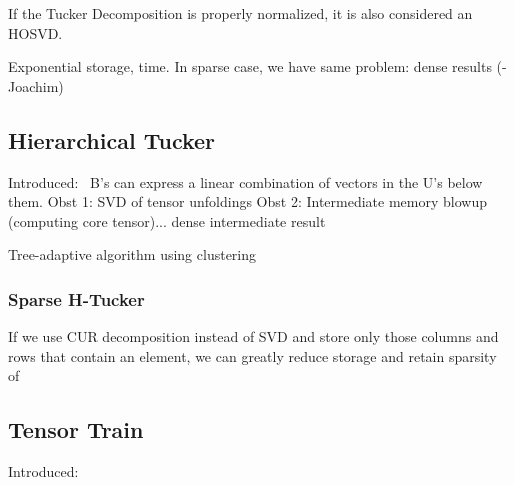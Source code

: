 If the Tucker Decomposition is properly normalized, it is also considered an HOSVD.

Exponential storage, time. In sparse case, we have same problem: dense results (-Joachim)
\subsection{Hierarchical Tucker}
Introduced:~\cite{Grasedyck:2010:HSV:1958286.1958311}
B's can express a linear combination of vectors in the U's below them.
Obst 1: SVD of tensor unfoldings
Obst 2: Intermediate memory blowup (computing core tensor)... dense intermediate result

Tree-adaptive algorithm using clustering~\cite{treeadap}

\subsubsection{Sparse H-Tucker}
If we use CUR decomposition instead of SVD and store only those columns and rows that contain an element, we can greatly reduce storage and retain sparsity of 

\subsection{Tensor Train}
Introduced:~\cite{Oseledets:2011:TD:2079141.2079149}

